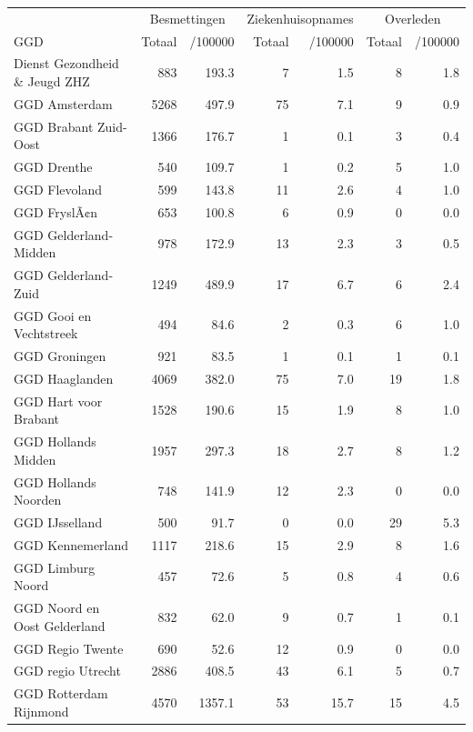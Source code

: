 \documentclass[
  english,
  man,floatsintext]{apa6}
\begin{document}
\begin{table}[H]
\centering\begingroup\fontsize{10}{12}\selectfont

\begin{threeparttable}
\begin{tabular}{lrrrrrr}
\toprule
\multicolumn{1}{c}{ } & \multicolumn{2}{c}{Besmettingen} & \multicolumn{2}{c}{Ziekenhuisopnames} & \multicolumn{2}{c}{Overleden} \\
\cmidrule(l{3pt}r{3pt}){2-3} \cmidrule(l{3pt}r{3pt}){4-5} \cmidrule(l{3pt}r{3pt}){6-7}
GGD & Totaal & /100000 & Totaal & /100000 & Totaal & /100000\\
\midrule
Dienst Gezondheid \& Jeugd ZHZ & 883 & 193.3 & 7 & 1.5 & 8 & 1.8\\
GGD Amsterdam & 5268 & 497.9 & 75 & 7.1 & 9 & 0.9\\
GGD Brabant Zuid-Oost & 1366 & 176.7 & 1 & 0.1 & 3 & 0.4\\
GGD Drenthe & 540 & 109.7 & 1 & 0.2 & 5 & 1.0\\
GGD Flevoland & 599 & 143.8 & 11 & 2.6 & 4 & 1.0\\
GGD FryslÃ¢n & 653 & 100.8 & 6 & 0.9 & 0 & 0.0\\
GGD Gelderland-Midden & 978 & 172.9 & 13 & 2.3 & 3 & 0.5\\
GGD Gelderland-Zuid & 1249 & 489.9 & 17 & 6.7 & 6 & 2.4\\
GGD Gooi en Vechtstreek & 494 & 84.6 & 2 & 0.3 & 6 & 1.0\\
GGD Groningen & 921 & 83.5 & 1 & 0.1 & 1 & 0.1\\
GGD Haaglanden & 4069 & 382.0 & 75 & 7.0 & 19 & 1.8\\
GGD Hart voor Brabant & 1528 & 190.6 & 15 & 1.9 & 8 & 1.0\\
GGD Hollands Midden & 1957 & 297.3 & 18 & 2.7 & 8 & 1.2\\
GGD Hollands Noorden & 748 & 141.9 & 12 & 2.3 & 0 & 0.0\\
GGD IJsselland & 500 & 91.7 & 0 & 0.0 & 29 & 5.3\\
GGD Kennemerland & 1117 & 218.6 & 15 & 2.9 & 8 & 1.6\\
GGD Limburg Noord & 457 & 72.6 & 5 & 0.8 & 4 & 0.6\\
GGD Noord en Oost Gelderland & 832 & 62.0 & 9 & 0.7 & 1 & 0.1\\
GGD Regio Twente & 690 & 52.6 & 12 & 0.9 & 0 & 0.0\\
GGD regio Utrecht & 2886 & 408.5 & 43 & 6.1 & 5 & 0.7\\
GGD Rotterdam Rijnmond & 4570 & 1357.1 & 53 & 15.7 & 15 & 4.5\\

\end{tabular}
\end{threeparttable}
\end{table}
\end{document}
